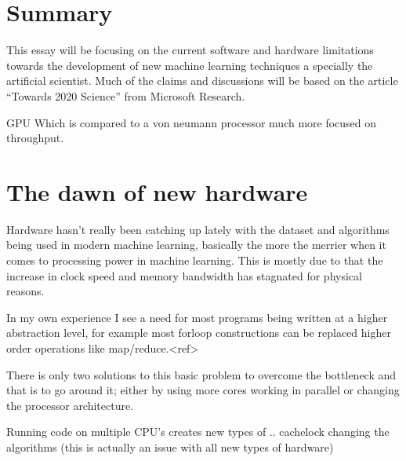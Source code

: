\documentclass{article}
\begin{document}
\section{Summary} %

    This essay will be focusing on the current software and hardware limitations
    towards the development of new machine learning techniques a specially the
    artificial scientist. Much of the claims and discussions will be based on
    the article ``Towards 2020 Science'' from Microsoft Research.\cite{ms2020}




GPU Which is compared to a von neumann processor much more focused on throughput.

\section{The dawn of new hardware}

    Hardware hasn't really been catching up lately with the dataset and algorithms
    being used in modern machine learning, basically the more the merrier when it comes
    to processing power in machine learning. This is mostly due to that the
    increase in clock speed and memory bandwidth has stagnated for physical
    reasons.
    
    In my own experience I see a need for most programs being written at
    a higher abstraction level, for example most forloop constructions can be
    replaced higher order operations like map/reduce.<ref> 

    There is only two solutions to this basic problem to overcome the
    bottleneck and that is to go around it; either by using more cores working in
    parallel or changing the processor architecture.

    Running code on multiple CPU's creates new types of .. 
    cachelock
    changing the algorithms (this is actually an issue with all new types of
    hardware)
\end{document}
